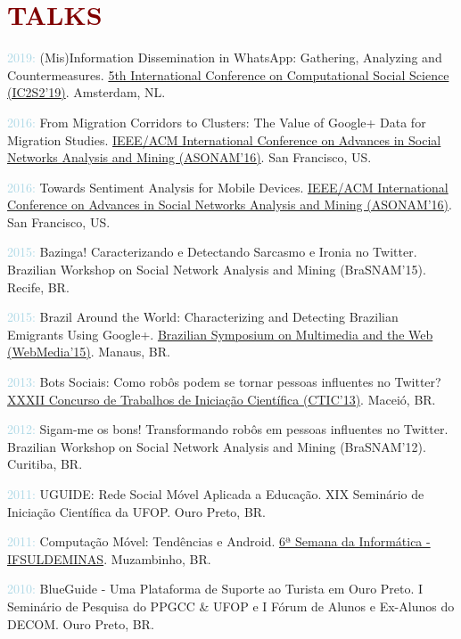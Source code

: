 
\section*{\textcolor{maroon}{\normalsize TALKS}} 

\begin{innerlist}[-]

    \item \textcolor{lightblue}{2019:} (Mis)Information Dissemination in WhatsApp: Gathering, Analyzing and Countermeasures. \href{https://2019.ic2s2.org/oral-presentations/}{5th International Conference on Computational Social Science (IC2S2'19)}. Amsterdam, NL.
    \item \textcolor{lightblue}{2016:} From Migration Corridors to Clusters: The Value of Google+ Data for Migration Studies. \href{http://asonam.cpsc.ucalgary.ca/2016/}{IEEE/ACM International Conference on Advances in Social Networks Analysis and Mining (ASONAM'16)}. San Francisco, US.
    \item \textcolor{lightblue}{2016:} Towards Sentiment Analysis for Mobile Devices. \href{http://asonam.cpsc.ucalgary.ca/2016/}{IEEE/ACM International Conference on Advances in Social Networks Analysis and Mining (ASONAM'16)}. San Francisco, US.
    \item \textcolor{lightblue}{2015:} Bazinga! Caracterizando e Detectando Sarcasmo e Ironia no Twitter. Brazilian Workshop on Social Network Analysis and Mining (BraSNAM'15). Recife, BR.
    \item \textcolor{lightblue}{2015:} Brazil Around the World: Characterizing and Detecting Brazilian Emigrants Using Google+. \href{https://webmedia.org.br/2015/}{Brazilian Symposium on Multimedia and the Web (WebMedia'15)}. Manaus, BR.
    \item \textcolor{lightblue}{2013:} Bots Sociais: Como robôs podem se tornar pessoas influentes no Twitter? \href{http://www.ic.ufal.br/csbc2013/noticias/ctic}{XXXII Concurso de Trabalhos de Iniciação Científica (CTIC'13)}. Maceió, BR.
    \item \textcolor{lightblue}{2012:} Sigam-me os bons! Transformando robôs em pessoas influentes no Twitter. Brazilian Workshop on Social Network Analysis and Mining (BraSNAM'12). Curitiba, BR.
    \item \textcolor{lightblue}{2011:} UGUIDE: Rede Social Móvel Aplicada a Educação. XIX Seminário de Iniciação Científica da UFOP. Ouro Preto, BR.
    \item \textcolor{lightblue}{2011:} Computação Móvel: Tendências e Android. \href{https://www2.muz.ifsuldeminas.edu.br/index.php/gerais/1149-semana-da-informatica}{6ª Semana da Informática - IFSULDEMINAS}. Muzambinho, BR.
    \item \textcolor{lightblue}{2010:} BlueGuide - Uma Plataforma de Suporte ao Turista em Ouro Preto. I Seminário de Pesquisa do PPGCC \& UFOP e I Fórum de Alunos e Ex-Alunos do DECOM. Ouro Preto, BR.
    
\end{innerlist}


